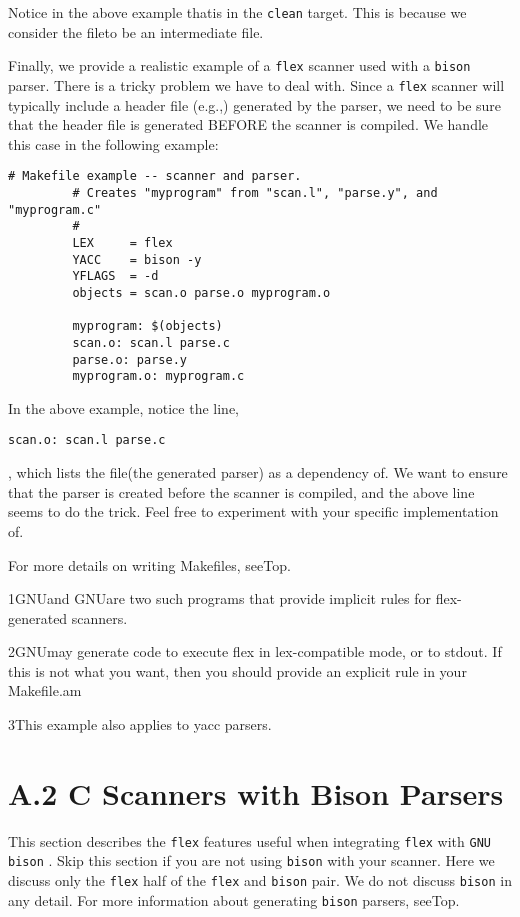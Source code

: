 \documentclass[openany,oneside]{book}
\begin{document}
Notice in the above example thatis in the \verb`clean` target. 
This is because we consider the fileto be an intermediate file.

Finally, we provide a realistic example of a \verb`flex` scanner used with a \verb`bison` parser. 
There is a tricky problem we have to deal with. Since a \verb`flex` scanner
will typically include a header file (e.g.,) generated by the
parser, we need to be sure that the header file is generated BEFORE the scanner
is compiled. We handle this case in the following example:
\begin{verbatim}
# Makefile example -- scanner and parser.
         # Creates "myprogram" from "scan.l", "parse.y", and "myprogram.c"
         #
         LEX     = flex
         YACC    = bison -y
         YFLAGS  = -d
         objects = scan.o parse.o myprogram.o
     
         myprogram: $(objects)
         scan.o: scan.l parse.c
         parse.o: parse.y
         myprogram.o: myprogram.c
\end{verbatim}


In the above example, notice the line,
\begin{verbatim}
scan.o: scan.l parse.c
\end{verbatim}


, which lists the file(the generated parser) as a dependency of. We want to ensure that the parser is created before the scanner
is compiled, and the above line seems to do the trick. Feel free to experiment
with your specific implementation of.

For more details on writing Makefiles, seeTop.

1GNUand GNUare two such
programs that provide implicit rules for flex-generated scanners.

2GNUmay generate code to execute flex in lex-compatible mode, or to stdout. If this is not what you want,
then you should provide an explicit rule in your Makefile.am

3This example also applies to yacc parsers.
\section{A.2 C Scanners with Bison Parsers}


This section describes the \verb`flex` features useful when integrating \verb`flex` with \verb`GNU bison` . 
Skip this section if you are not using \verb`bison` with your scanner.  Here we discuss only the \verb`flex` half of the \verb`flex` and \verb`bison` pair.  We do not discuss \verb`bison` in any detail.  For more information about generating \verb`bison` parsers, seeTop.
\end{document}
